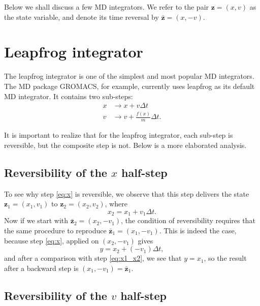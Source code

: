 \documentclass{article}
\begin{document}
Below we shall discuss a few MD integrators.
%
We refer to the pair $\mathbf z = (x, v)$ as the state variable,
and denote its time reversal by $\bar{\mathbf z} = (x, -v)$.



\section{Leapfrog integrator}


The leapfrog integrator is one of the simplest and most popular MD integrators.
The MD package GROMACS, for example, currently uses leapfrog
as its default MD integrator.
%
It contains two sub-steps:
\begin{align}
x &\rightarrow x + v \Delta t
\tag{X}
\label{eq:x}
\\
v &\rightarrow v + \frac{f(x)}{m} \Delta t.
\tag{V}
\label{eq:v}
\end{align}

It is important to realize that for the leapfrog integrator,
each sub-step is reversible,
but the composite step is not.
Below is a more elaborated analysis.

\subsection{Reversibility of the $x$ half-step}

To see why step \eqref{eq:x} is reversible,
we observe that this step delivers the state $\mathbf z_1 = (x_1, v_1)$
to $\mathbf z_2 = (x_2, v_2)$, where
\begin{equation}
x_2 = x_1 + v_1 \Delta t.
\label{eq:x1_x2}
\end{equation}
Now if we start with $\bar{\mathbf z}_2 = (x_2, -v_1)$,
the condition of reversibility requires that the same procedure
to reproduce $\bar{\mathbf z}_1 = (x_1, -v_1)$.
%
This is indeed the case, because step \eqref{eq:x}, applied on $(x_2, -v_1)$
gives
\begin{equation}
y = x_2 + (-v_1) \Delta t,
\end{equation}
and after a comparison with step \eqref{eq:x1_x2}, we see that $y = x_1$,
so the result after a backward step is $(x_1, -v_1) = \bar{\mathbf z}_1$.

\subsection{Reversibility of the $v$ half-step}
\end{document}
